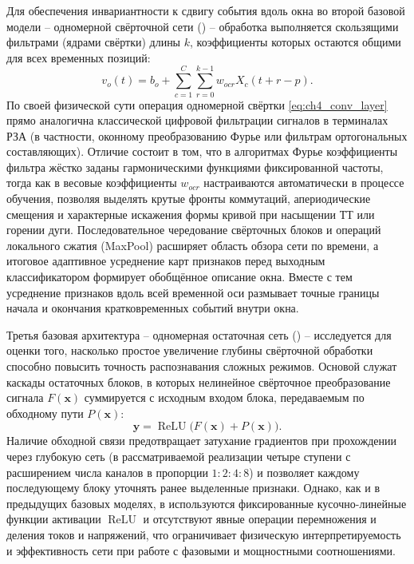 Для обеспечения инвариантности к сдвигу события вдоль окна во второй
базовой модели -- одномерной свёрточной сети () --
обработка выполняется скользящими фильтрами (ядрами свёртки) длины $k$,
коэффициенты которых остаются общими для всех временных позиций:
\begin{equation}
    v_o(t)=b_o+\sum_{c=1}^{C}\sum_{r=0}^{k-1}
        w_{ocr}X_c(t+r-p).
    \label{eq:ch4_conv_layer}
\end{equation}
По своей физической сути операция одномерной свёртки \eqref{eq:ch4_conv_layer}
прямо аналогична классической цифровой фильтрации сигналов в терминалах
РЗА (в частности, оконному преобразованию Фурье или фильтрам
ортогональных составляющих). Отличие состоит в том, что в алгоритмах
Фурье коэффициенты фильтра жёстко заданы гармоническими функциями
фиксированной частоты, тогда как в  весовые коэффициенты
$w_{ocr}$ настраиваются автоматически в процессе обучения, позволяя
выделять крутые фронты коммутаций, апериодические смещения и характерные
искажения формы кривой при насыщении ТТ или горении дуги. Последовательное
чередование свёрточных блоков и операций локального сжатия (MaxPool)
расширяет область обзора сети по времени, а итоговое адаптивное
усреднение карт признаков перед выходным классификатором формирует
обобщённое описание окна. Вместе с тем усреднение признаков вдоль всей
временной оси размывает точные границы начала и окончания кратковременных
событий внутри окна.

Третья базовая архитектура -- одномерная остаточная сеть () --
исследуется для оценки того, насколько простое увеличение глубины
свёрточной обработки способно повысить точность распознавания сложных
режимов. Основой  служат каскады остаточных блоков, в
которых нелинейное свёрточное преобразование сигнала $F(\boldsymbol{x})$
суммируется с исходным входом блока, передаваемым по обходному пути
$P(\boldsymbol{x})$:
\begin{equation}
    \boldsymbol{y}=\operatorname{ReLU}
       \bigl(F(\boldsymbol{x})+P(\boldsymbol{x})\bigr).
    \label{eq:ch4_residual_block}
\end{equation}
Наличие обходной связи предотвращает затухание градиентов при прохождении
через глубокую сеть (в рассматриваемой реализации четыре ступени с
расширением числа каналов в пропорции $1:2:4:8$) и позволяет каждому
последующему блоку уточнять ранее выделенные признаки. Однако, как и в
предыдущих базовых моделях, в  используются фиксированные
кусочно-линейные функции активации $\operatorname{ReLU}$ и отсутствуют
явные операции перемножения и деления токов и напряжений, что
ограничивает физическую интерпретируемость и эффективность сети при
работе с фазовыми и мощностными соотношениями.

